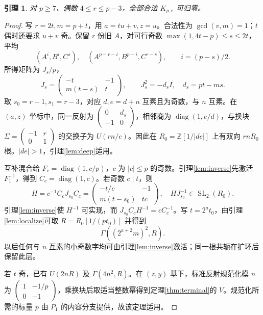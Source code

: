 \documentclass[11pt,a4paper]{article}
\newcommand{\Z}{\mathbb Z}
\newcommand{\SL}{\operatorname{SL}}
\newcommand{\diag}{\operatorname{diag}}
\newtheorem{lemma}[theorem]{引理}
\theoremstyle{definition}
\numberwithin{equation}{section}
\begin{document}
\begin{lemma}\label{lem:even-core}
对 $p\ge7$、偶数 $4\le r\le p-3$，全部合法 $K_{p,r}$ 可归零。
\end{lemma}
\begin{proof}
写 $r=2t,m=p+t$，用 $a=tu+v,z=u$。合法性为 $\gcd(v,m)=1$；$t$ 偶时还要求 $u+v$ 奇。保留 $r$ 份旧 $A$，对可行奇数 $\max(1,4t-p)\le s\le2t$，平均
\begin{equation}\label{eq:even-reflection}
(A^i,B^i,C^s),\quad(A^{p-r-i},B^{p-i},C^{r-s}),\qquad i=(p-s)/2.
\end{equation}
所得矩阵为 $J_s/p$，
\[
J_s=\begin{pmatrix}-t&-1\\m(t-s)&t\end{pmatrix},\qquad
J_s^2=-d_sI,\quad d_s=pt-ms.
\]
取 $s_0=r-1,s_1=r-3$，对应 $d,e=d+n$ 互素且为奇数，与 $n$ 互素。在 $(a,z)$ 坐标中，同一反射为 $\left(\begin{smallmatrix}0&d_s\\-1&0\end{smallmatrix}\right)$，相邻商为 $\diag(1,e/d)$，与换块 $\Sigma=\left(\begin{smallmatrix}-1&r\\0&1\end{smallmatrix}\right)$ 的交换子为 $U(rn/e)$。因此在 $R_0=\Z[1/|de|]$ 上有双向 $rnR_0$ 根。$|de|>1$，引理\ref{lem:deep}适用。

互补混合给 $F_c=\diag(1,c/p)$，$c$ 为 $|c|\le p$ 的奇数。引理\ref{lem:inverse}先激活 $F_1^{-1}$，得到 $C_c=\diag(1,c)$。若奇数 $c\mid t$，则
\[
H=c^{-1}C_cJ_{s_0}C_c
=\begin{pmatrix}-t/c&-1\\m(t-s_0)&tc\end{pmatrix},\quad
HJ_{s_0}^{-1}\in\SL_2(R_0).
\]
引理\ref{lem:inverse}使 $H^{-1}$ 可实现，而 $J_{s_0}C_cH^{-1}=cC_c^{-1}$。写 $t=2^a t_0$，由引理\ref{lem:localize}可取 $R=R_0[1/(pt_0)]$ 并得到
\begin{equation}
\Gamma((2^{a+2}m)^2,R).
\end{equation}
以后任何与 $n$ 互素的小奇数字均可由引理\ref{lem:inverse}激活；同一根共轭在扩环后保留此层。

若 $t$ 奇，已有 $U(2nR)$ 及 $\Gamma(4n^2,R)$。在 $(z,y)$ 基下，标准反射规范化模 $n$ 为 $\left(\begin{smallmatrix}1&-1/p\\0&-1\end{smallmatrix}\right)$，乘换块后取适当整数幂得到定理\ref{thm:terminal}的 $V$。规范化所需的标量 $p$ 由 $P_1$ 的内容分支提供，故该定理适用。


\end{proof}
\end{document}
